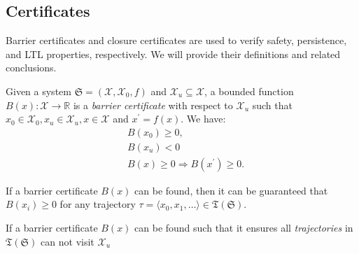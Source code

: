 \documentclass[acmlarge]{acmart}
\begin{document}

\subsection{Certificates}
Barrier certificates and closure certificates are used to verify safety\cite{prajna2004safety}, persistence\cite{murali2024closure}, and LTL properties\cite{murali2024closure}, respectively. We will provide their definitions and related conclusions.

\begin{definition}
  \label{SCDEF}
  Given a system $\mathfrak{S} = (\mathcal{X}, \mathcal{X}_0, f)$ and $\mathcal{X}_{u} \subseteq \mathcal{X}$, a bounded function $B(x): \mathcal{X} \rightarrow \mathbb{R}$ is a \emph{barrier certificate} with respect to $\mathcal{X}_{u}$ such that $x_0 \in \mathcal{X}_0, x_u \in \mathcal{X}_u, x \in \mathcal{X}$ and $x^{\prime} = f(x)$. We have:
  \begin{align}
    &B(x_0) \geq 0, \label{bsinn0} \\ %
    &B(x_u) < 0 \label{bsun0} \\ %
    &B(x) \geq 0 \Rightarrow B(x^{\prime}) \geq 0. \label{bstnn0} %
  \end{align}
\end{definition}
\begin{theorem}
  If a barrier certificate \( B(x) \) can be found, then it can be guaranteed that $B(x_i) \geq 0$ for any trajectory $\tau=\langle x_0, x_1, \dots \rangle \in \mathfrak{T}(\mathfrak{S})$.
\end{theorem}
\begin{corollary}[safety]
  \label{corollary_tbsc}
  If a barrier certificate \( B(x) \) can be found such that it ensures all \emph{trajectories} in $\mathfrak{T}(\mathfrak{S})$ can not visit $\mathcal{X}_{u}$
\end{corollary}
\end{document}
